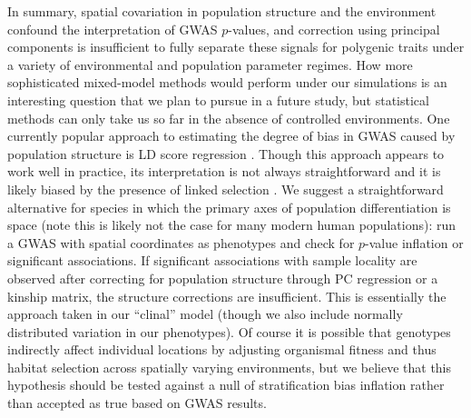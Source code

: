 \documentclass[11pt,twoside,lineno]{preprint}
\newif\ifcomments
\newcommand{\cjb}[1]{\ifcomments{{\color{orange} \it (#1)}}\else{}\fi}
\begin{document}
In summary, spatial covariation in population structure and the environment confound the interpretation of GWAS $p$-values, and correction using principal components is insufficient to fully separate these signals for polygenic traits under a variety of environmental and population parameter regimes. How more sophisticated mixed-model methods would perform under our simulations is an interesting question that we plan to pursue in a future study, but statistical methods can only take us so far in the absence of controlled environments. One currently popular approach to estimating the degree of bias in GWAS caused by population structure is LD score regression \citep{Bulik-Sullivan2015}. Though this approach appears to work well in practice, its interpretation is not always straightforward and it is likely biased by the presence of linked selection \citep{Berg2018}. We suggest a straightforward alternative for species in which the primary axes of population differentiation is space (note this is likely not the case for many modern human populations): run a GWAS with spatial coordinates as phenotypes and check for $p$-value inflation or significant associations. If significant associations with sample locality are observed after correcting for population structure through PC regression or a kinship matrix, the structure corrections are insufficient. This is essentially the approach taken in our ``clinal'' model (though we also include normally distributed variation in our phenotypes). Of course it is possible that genotypes indirectly affect individual locations by adjusting organismal fitness and thus habitat selection across spatially varying environments, but we believe that this hypothesis should be tested against a null of stratification bias inflation rather than accepted as true based on GWAS results.  \cjb{what do you think of the second half here?}
\end{document}
